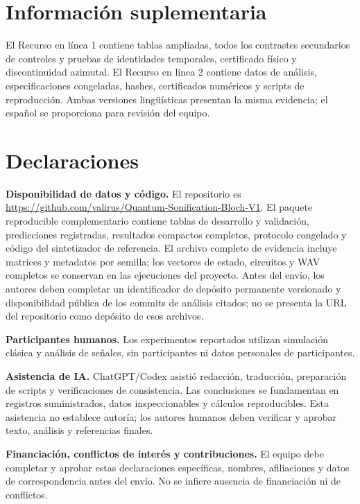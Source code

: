 \documentclass[pdflatex,iicol,sn-basic,Numbered]{sn-jnl}
\begin{document}
\backmatter
\section*{Información suplementaria}
El Recurso en línea 1 contiene tablas ampliadas, todos los contrastes secundarios de controles y pruebas de identidades temporales, certificado físico y discontinuidad azimutal. El Recurso en línea 2 contiene datos de análisis, especificaciones congeladas, hashes, certificados numéricos y scripts de reproducción. Ambas versiones lingüísticas presentan la misma evidencia; el español se proporciona para revisión del equipo.

\section*{Declaraciones}
\textbf{Disponibilidad de datos y código.} El repositorio es \url{https://github.com/valirus/Quantum-Sonification-Bloch-V1}. El paquete reproducible complementario contiene tablas de desarrollo y validación, predicciones registradas, resultados compactos completos, protocolo congelado y código del sintetizador de referencia. El archivo completo de evidencia incluye matrices y metadatos por semilla; los vectores de estado, circuitos y WAV completos se conservan en las ejecuciones del proyecto. Antes del envío, los autores deben completar un identificador de depósito permanente versionado y disponibilidad pública de los commits de análisis citados; no se presenta la URL del repositorio como depósito de esos archivos.

\textbf{Participantes humanos.} Los experimentos reportados utilizan simulación clásica y análisis de señales, sin participantes ni datos personales de participantes.

\textbf{Asistencia de IA.} ChatGPT/Codex asistió redacción, traducción, preparación de scripts y verificaciones de consistencia. Las conclusiones se fundamentan en registros suministrados, datos inspeccionables y cálculos reproducibles. Esta asistencia no establece autoría; los autores humanos deben verificar y aprobar texto, análisis y referencias finales.

\textbf{Financiación, conflictos de interés y contribuciones.} El equipo debe completar y aprobar estas declaraciones específicas, nombres, afiliaciones y datos de correspondencia antes del envío. No se infiere ausencia de financiación ni de conflictos.


\end{document}
